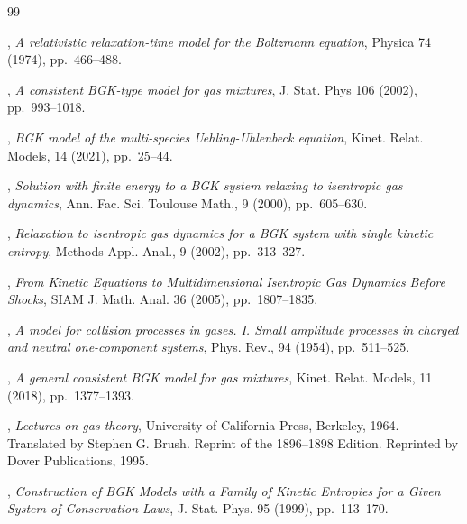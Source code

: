 \documentclass{amsart}
\theoremstyle{plain}
\theoremstyle{remark}
\numberwithin{equation}{section}
\begin{document}

\begin{thebibliography}{99}

, \emph{A relativistic relaxation-time model for the Boltzmann equation}, Physica 74 (1974), pp.~466--488.

, \emph{A consistent BGK-type model for gas mixtures}, J. Stat. Phys {106} (2002), pp.~993--1018.


, \emph{BGK model of the multi-species Uehling-Uhlenbeck equation}, Kinet. Relat. Models, {14} (2021), pp.~25--44.


, \emph{Solution with finite energy to a BGK system relaxing to isentropic gas dynamics},
Ann. Fac. Sci. Toulouse Math., {9} (2000), pp.~605--630.

, \emph{Relaxation to isentropic gas dynamics for a BGK system with single kinetic entropy}, Methods Appl. Anal., {9} (2002), pp.~313--327.

,
\emph{From Kinetic Equations to Multidimensional Isentropic Gas Dynamics Before Shocks},
SIAM J. Math. Anal. {36} (2005), pp.~1807--1835.

, \emph{A model for collision processes in gases. I. Small amplitude processes in charged and neutral one-component systems}, Phys. Rev., {94} (1954), pp.~511--525. 

, \emph{A general consistent BGK model for gas mixtures},
Kinet. Relat. Models, {11} (2018), pp.~1377--1393.


, \emph{Lectures on gas theory}, University of California Press, Berkeley, 1964. Translated by Stephen G. Brush. Reprint of the 1896–1898 Edition. Reprinted by Dover Publications, 1995.


,
\emph{Construction of BGK Models with a Family of Kinetic Entropies for a Given System of Conservation Laws},
J. Stat. Phys. {95} (1999), pp.~113--170.


\end{thebibliography}
\end{document}
